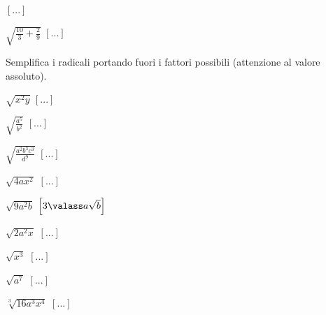 \begin{esercizio}[\Ast]
\begin{multicols}{4}
\begin{enumeratea}
  \hfill $\left[...\right]$
 \item $\sqrt{\frac{10} 3+\frac 2 9}$
  \hfill $\left[...\right]$
 \end{enumeratea}
 \end{multicols}
\end{esercizio}

\begin{esercizio}[\Ast]
 \label{ese:2.44}
Semplifica i radicali portando fuori i fattori possibili 
(attenzione al valore assoluto).
 \begin{multicols}{3}
 \begin{enumeratea}
 \item $\sqrt{x^2y}$
  \hfill $\left[...\right]$
 \item $\sqrt{\frac{a^5}{b^2}}$
  \hfill $\left[...\right]$
 \item $\sqrt{\frac{a^2b^3c^3}{d^9}}$
  \hfill $\left[...\right]$
 \item $\sqrt{4ax^2}$
  \hfill $\left[...\right]$
 \item $\sqrt{9a^2b}$
  \hfill $\left[3\valass a\sqrt{b}\right]$
 \item $\sqrt{2a^2x}$
  \hfill $\left[...\right]$
 \item $\sqrt{x^3}$
  \hfill $\left[...\right]$
 \item $\sqrt{a^7}$
  \hfill $\left[...\right]$
 \item $\sqrt[3]{16a^3x^4}$
  \hfill $\left[...\right]$
 \end{enumeratea}
 \end{multicols}
\end{esercizio}


